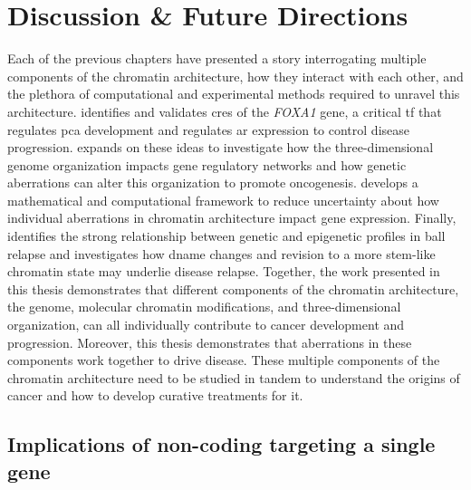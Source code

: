 \chapter{Discussion \& Future Directions}
\label{chap:discussion}

Each of the previous chapters have presented a story interrogating multiple components of the chromatin architecture, how they interact with each other, and the plethora of computational and experimental methods required to unravel this architecture.
 identifies and validates \glspl{cre} of the \emph{FOXA1} gene, a critical \gls{tf} that regulates \gls{pca} development and regulates \gls{ar} expression to control disease progression.
 expands on these ideas to investigate how the three-dimensional genome organization impacts gene regulatory networks and how genetic aberrations can alter this organization to promote oncogenesis.
 develops a mathematical and computational framework to reduce uncertainty about how individual aberrations in chromatin architecture impact gene expression.
Finally,  identifies the strong relationship between genetic and epigenetic profiles in \gls{ball} relapse and investigates how \gls{dname} changes and revision to a more stem-like chromatin state may underlie disease relapse.
Together, the work presented in this thesis demonstrates that different components of the chromatin architecture, the genome, molecular chromatin modifications, and three-dimensional organization, can all individually contribute to cancer development and progression.
Moreover, this thesis demonstrates that aberrations in these components work together to drive disease.
These multiple components of the chromatin architecture need to be studied in tandem to understand the origins of cancer and how to develop curative treatments for it.

\section{Implications of non-coding  targeting a single gene}

